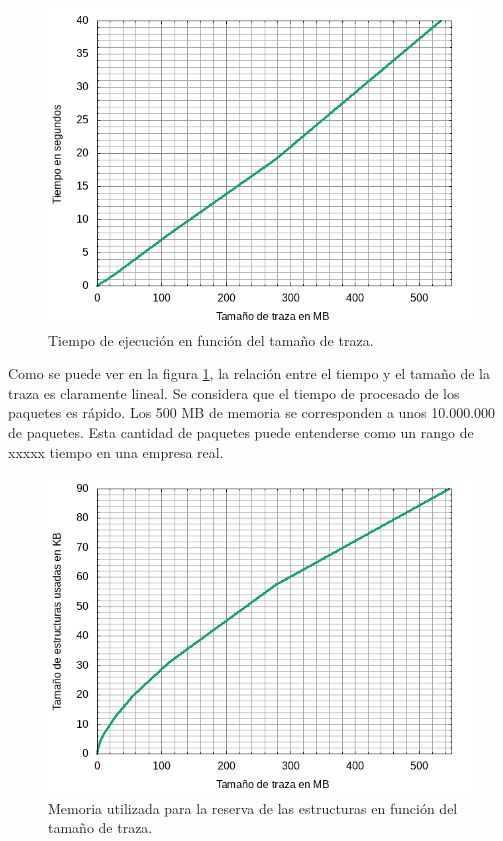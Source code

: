 \documentclass[twoside, 12pt]{epstfg}
\begin{document}
\begin{figure}[H]
\centering
\includegraphics[scale=0.8]{latex/gnuplot/png/time.png}
\caption[Gráfica de tiempo de ejecución]{Tiempo de ejecución en función del tamaño de traza.}
\label{fig:Pruebas:Tiempo}
\end{figure}

Como se puede ver en la figura \ref{fig:Pruebas:Tiempo}, la relación entre el tiempo y el tamaño de la traza es claramente lineal. Se considera que el tiempo de procesado de los paquetes es rápido. Los 500 MB de memoria se corresponden a unos 10.000.000 de paquetes. Esta cantidad de paquetes puede entenderse como un rango de xxxxx tiempo en una empresa real. %

\begin{figure}[H]
\centering
\includegraphics[scale=0.8]{latex/gnuplot/png/memory-usage.png}
\caption[Gráfica de memoria usada]{Memoria utilizada para la reserva de las estructuras en función del tamaño de traza.}
\label{fig:Pruebas:Memoria}
\end{figure}
\end{document}
